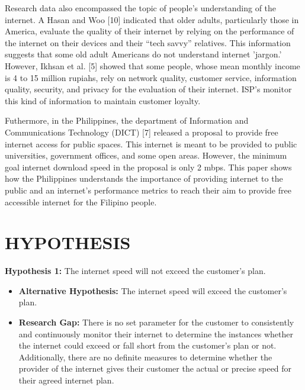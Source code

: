 \documentclass[conference]{IEEEtran}
\begin{document}
Research data also encompassed the topic of people's understanding of the internet. A Hasan and Woo [10] indicated that older adults, particularly those in America, evaluate the quality of their internet by relying on the performance of the internet on their devices and their “tech savvy” relatives. This information suggests that some old adult Americans do not understand internet 'jargon.' However, Ikhsan et al. [5] showed that some people, whose mean monthly income is 4 to 15 million rupiahs, rely on network quality, customer service, information quality, security, and privacy for the evaluation of their internet. ISP's monitor this kind of information to maintain customer loyalty.

Futhermore, in the Philippines, the department of Information and Communications Technology (DICT) [7] released a proposal to provide free internet access for public spaces. This internet is meant to be provided to public universities, government offices, and some open areas. However, the minimum goal internet download speed in the proposal is only 2 mbps. This paper shows how the Philippines understands the importance of providing internet to the public and an internet's performance metrics to reach their aim to provide free accessible internet for the Filipino people.

\section{HYPOTHESIS}
\textbf{Hypothesis 1:} The internet speed will not exceed the customer's plan.
\begin{itemize}
    \item \textbf{Alternative Hypothesis:} The internet speed will exceed the customer's plan.
    \item \textbf{Research Gap:} There is no set parameter for the customer to consistently and continuously monitor their internet to determine the instances whether the internet could exceed or fall short from the customer's plan or not. Additionally, there are no definite measures to determine whether the provider of the internet gives their customer the actual or precise speed for their agreed internet plan.
\end{itemize}
\end{document}
